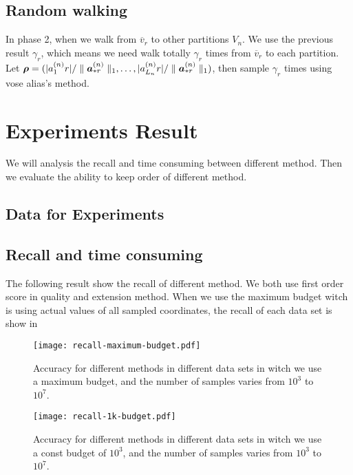 \documentclass[letterpaper]{article}
\newcommand{\V}[1]{{\bm{{\MakeLowercase{#1}}}}}
\newcommand{\Vacol}[1]{\V{a}^{(#1)}_{*r}}
\newcommand{\norm}[2]{\parallel#1\parallel_{#2}}
\begin{document}
\subsection{Random walking}

In phase 2, when we walk from $\overline{v}_r$ to other partitions $V_n$. We use the previous result $\gamma_{r}$, which means we need walk totally $\gamma_{r}$ times from $\overline{v}_r$ to each  partition. Let $\V{\rho} = (|{a}^{(n)}_{1}{r}|/\norm{\Vacol{n}}{1},\ldots,|{a}^{(n)}_{L_n}{r}|/\norm{\Vacol{n}}{1})$, then sample $\gamma_{r}$ times using vose alias's method.
\section{Experiments Result}
We will analysis the recall and time consuming  between different method. Then we evaluate the ability to keep order of different method.
\subsection{Data for Experiments}

\subsection{Recall and time consuming}
The following result show the recall of different method. We both use first order score in quality and extension method.
When we use the maximum budget witch is using actual values of all sampled coordinates, the recall of each data set is show in ~

\begin{figure}[ht]
  \centering
  \texttt{[image: recall-maximum-budget.pdf]}\\
  \caption{Accuracy for different methods in different data sets in witch we use a maximum budget, and the number of samples varies from $10^3$ to $10^7$.}
  \label{Fig:RecallMaxBudget}
\end{figure}

\begin{figure}[ht]
  \centering
  \texttt{[image: recall-1k-budget.pdf]}\\
  \caption{Accuracy for different methods in different data sets in witch we use a const budget of $10^3$, and the number of samples varies from $10^3$ to $10^7$.}
  \label{Fig:Recall1kBudget}
\end{figure}
\end{document}
